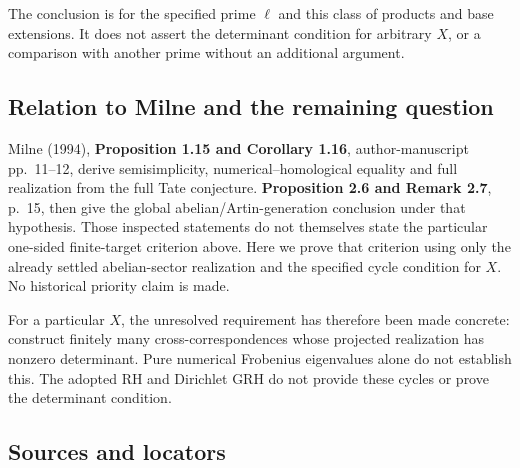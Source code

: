 The conclusion is for the specified prime \(\ell\) and this class of
products and base extensions. It does not assert the determinant
condition for arbitrary \(X\), or a comparison with another prime
without an additional argument.

\subsection{Relation to Milne and the remaining
question}\label{relation-to-milne-and-the-remaining-question}

Milne (1994), \textbf{Proposition 1.15 and Corollary 1.16},
author-manuscript pp.~11--12, derive semisimplicity,
numerical--homological equality and full realization from the full Tate
conjecture. \textbf{Proposition 2.6 and Remark 2.7}, p.~15, then give
the global abelian/Artin-generation conclusion under that hypothesis.
Those inspected statements do not themselves state the particular
one-sided finite-target criterion above. Here we prove that criterion
using only the already settled abelian-sector realization and the
specified cycle condition for \(X\). No historical priority claim is
made.

For a particular \(X\), the unresolved requirement has therefore been
made concrete: construct finitely many cross-correspondences whose
projected realization has nonzero determinant. Pure numerical Frobenius
eigenvalues alone do not establish this. The adopted RH and Dirichlet
GRH do not provide these cycles or prove the determinant condition.

\subsection{Sources and locators}\label{sources-and-locators}

